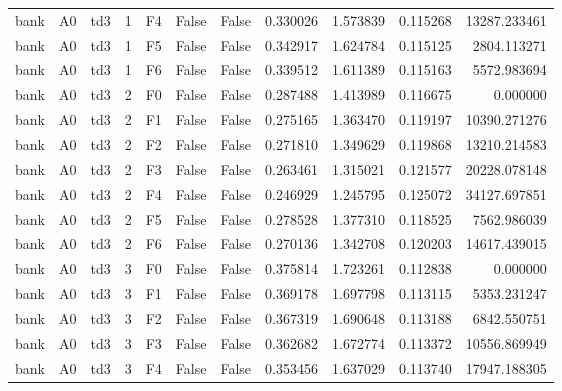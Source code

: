 \begin{tabular}{lllrlllrrrr}
      bank &      A0 &       td3 &     1 &  F4 &           False &            False &  0.330026 &  1.573839 & 0.115268 &     13287.233461 \\
      bank &      A0 &       td3 &     1 &  F5 &           False &            False &  0.342917 &  1.624784 & 0.115125 &      2804.113271 \\
      bank &      A0 &       td3 &     1 &  F6 &           False &            False &  0.339512 &  1.611389 & 0.115163 &      5572.983694 \\
      bank &      A0 &       td3 &     2 &  F0 &           False &            False &  0.287488 &  1.413989 & 0.116675 &         0.000000 \\
      bank &      A0 &       td3 &     2 &  F1 &           False &            False &  0.275165 &  1.363470 & 0.119197 &     10390.271276 \\
      bank &      A0 &       td3 &     2 &  F2 &           False &            False &  0.271810 &  1.349629 & 0.119868 &     13210.214583 \\
      bank &      A0 &       td3 &     2 &  F3 &           False &            False &  0.263461 &  1.315021 & 0.121577 &     20228.078148 \\
      bank &      A0 &       td3 &     2 &  F4 &           False &            False &  0.246929 &  1.245795 & 0.125072 &     34127.697851 \\
      bank &      A0 &       td3 &     2 &  F5 &           False &            False &  0.278528 &  1.377310 & 0.118525 &      7562.986039 \\
      bank &      A0 &       td3 &     2 &  F6 &           False &            False &  0.270136 &  1.342708 & 0.120203 &     14617.439015 \\
      bank &      A0 &       td3 &     3 &  F0 &           False &            False &  0.375814 &  1.723261 & 0.112838 &         0.000000 \\
      bank &      A0 &       td3 &     3 &  F1 &           False &            False &  0.369178 &  1.697798 & 0.113115 &      5353.231247 \\
      bank &      A0 &       td3 &     3 &  F2 &           False &            False &  0.367319 &  1.690648 & 0.113188 &      6842.550751 \\
      bank &      A0 &       td3 &     3 &  F3 &           False &            False &  0.362682 &  1.672774 & 0.113372 &     10556.869949 \\
      bank &      A0 &       td3 &     3 &  F4 &           False &            False &  0.353456 &  1.637029 & 0.113740 &     17947.188305 \\

\end{tabular}
